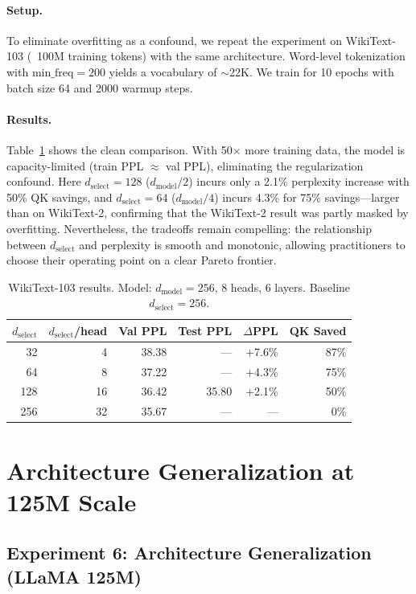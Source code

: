 \documentclass{article} %
\newcommand{\dmodel}{d_{\text{model}}}
\newcommand{\dselect}{d_{\text{select}}}
\begin{document}
\paragraph{Setup.}
To eliminate overfitting as a confound, we repeat the experiment on WikiText-103 \citep{merity2017pointer} (~100M training tokens) with the same architecture. Word-level tokenization with $\text{min\_freq} = 200$ yields a vocabulary of $\sim$22K. We train for 10 epochs with batch size 64 and 2000 warmup steps.

\paragraph{Results.}
Table~\ref{tab:wt103} shows the clean comparison. With 50$\times$ more training data, the model is capacity-limited (train PPL $\approx$ val PPL), eliminating the regularization confound. Here $\dselect = 128$ ($\dmodel/2$) incurs only a 2.1\% perplexity increase with 50\% QK savings, and $\dselect = 64$ ($\dmodel/4$) incurs 4.3\% for 75\% savings---larger than on WikiText-2, confirming that the WikiText-2 result was partly masked by overfitting. Nevertheless, the tradeoffs remain compelling: the relationship between $\dselect$ and perplexity is smooth and monotonic, allowing practitioners to choose their operating point on a clear Pareto frontier.

\begin{table}[h]
\centering
\caption{WikiText-103 results. Model: $\dmodel = 256$, 8 heads, 6 layers. Baseline $\dselect = 256$.}
\label{tab:wt103}
\begin{tabular}{rrrrrr}
\toprule
$\dselect$ & $\dselect$/head & Val PPL & Test PPL & $\Delta$PPL & QK Saved \\
\midrule
32  & 4  & 38.38 & ---   & +7.6\% & 87\% \\
64  & 8  & 37.22 & ---   & +4.3\% & 75\% \\
128 & 16 & 36.42 & 35.80 & +2.1\% & 50\% \\
256 & 32 & 35.67 & ---   & ---    & 0\% \\
\bottomrule
\end{tabular}
\end{table}


\section{Architecture Generalization at 125M Scale}\label{app:arch_125m}

\subsection{Experiment 6: Architecture Generalization (LLaMA 125M)}
\end{document}
